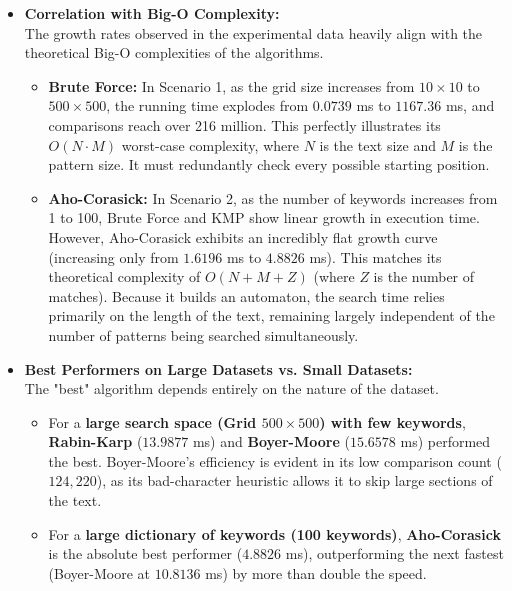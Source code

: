 \begin{itemize}
    \item \textbf{Correlation with Big-O Complexity:}\\
    The growth rates observed in the experimental data heavily align with the theoretical Big-O complexities of the algorithms. 
    \begin{itemize}
        \item \textbf{Brute Force:} In Scenario 1, as the grid size increases from $10 \times 10$ to $500 \times 500$, the running time explodes from $0.0739$ ms to $1167.36$ ms, and comparisons reach over 216 million. This perfectly illustrates its $O(N \cdot M)$ worst-case complexity, where $N$ is the text size and $M$ is the pattern size. It must redundantly check every possible starting position.
        \item \textbf{Aho-Corasick:} In Scenario 2, as the number of keywords increases from 1 to 100, Brute Force and KMP show linear growth in execution time. However, Aho-Corasick exhibits an incredibly flat growth curve (increasing only from $1.6196$ ms to $4.8826$ ms). This matches its theoretical complexity of $O(N + M + Z)$ (where $Z$ is the number of matches). Because it builds an automaton, the search time relies primarily on the length of the text, remaining largely independent of the number of patterns being searched simultaneously.
    \end{itemize}

    \vspace{0.2cm}
    \item \textbf{Best Performers on Large Datasets vs. Small Datasets:}\\
    The "best" algorithm depends entirely on the nature of the dataset.
    \begin{itemize}
        \item For a \textbf{large search space (Grid $500 \times 500$) with few keywords}, \textbf{Rabin-Karp} ($13.9877$ ms) and \textbf{Boyer-Moore} ($15.6578$ ms) performed the best. Boyer-Moore's efficiency is evident in its low comparison count ($124,220$), as its bad-character heuristic allows it to skip large sections of the text.
        \item For a \textbf{large dictionary of keywords (100 keywords)}, \textbf{Aho-Corasick} is the absolute best performer ($4.8826$ ms), outperforming the next fastest (Boyer-Moore at $10.8136$ ms) by more than double the speed.
    \end{itemize}
    

\end{itemize}
